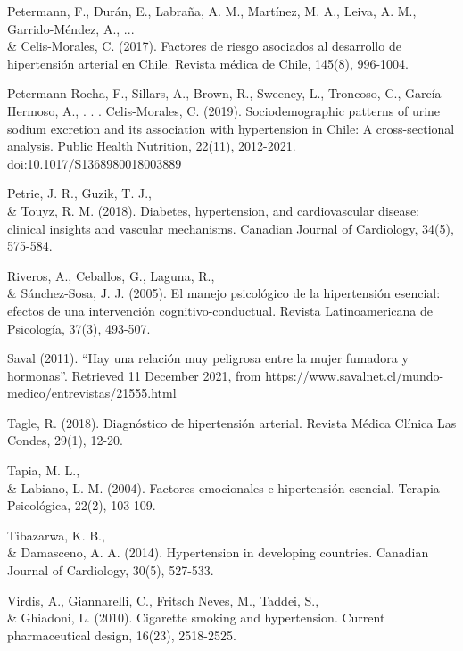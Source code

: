 \documentclass{aa}
\begin{document}
\begin{hangparas}{.25in}{1}
Petermann, F., Durán, E., Labraña, A. M., Martínez, M. A., Leiva, A. M., Garrido-Méndez, A., ... \\\& Celis-Morales, C. (2017). Factores de riesgo asociados al desarrollo de hipertensión arterial en Chile. Revista médica de Chile, 145(8), 996-1004.

Petermann-Rocha, F., Sillars, A., Brown, R., Sweeney, L., Troncoso, C., García-Hermoso, A., . . . Celis-Morales, C. (2019). Sociodemographic patterns of urine sodium excretion and its association with hypertension in Chile: A cross-sectional analysis. Public Health Nutrition, 22(11), 2012-2021. doi:10.1017/S1368980018003889

Petrie, J. R., Guzik, T. J., \\\& Touyz, R. M. (2018). Diabetes, hypertension, and cardiovascular disease: clinical insights and vascular mechanisms. Canadian Journal of Cardiology, 34(5), 575-584.

Riveros, A., Ceballos, G., Laguna, R., \\\& Sánchez-Sosa, J. J. (2005). El manejo psicológico de la hipertensión esencial: efectos de una intervención cognitivo-conductual. Revista Latinoamericana de Psicología, 37(3), 493-507.

Saval (2011). “Hay una relación muy peligrosa entre la mujer fumadora y hormonas”. Retrieved 11 December 2021, from https://www.savalnet.cl/mundo-medico/entrevistas/21555.html

Tagle, R. (2018). Diagnóstico de hipertensión arterial. Revista Médica Clínica Las Condes, 29(1), 12-20.

Tapia, M. L., \\\& Labiano, L. M. (2004). Factores emocionales e hipertensión esencial. Terapia Psicológica, 22(2), 103-109.

Tibazarwa, K. B., \\\& Damasceno, A. A. (2014). Hypertension in developing countries. Canadian Journal of Cardiology, 30(5), 527-533. 

Virdis, A., Giannarelli, C., Fritsch Neves, M., Taddei, S., \\\& Ghiadoni, L. (2010). Cigarette smoking and hypertension. Current pharmaceutical design, 16(23), 2518-2525.


\end{hangparas}
\end{document}
